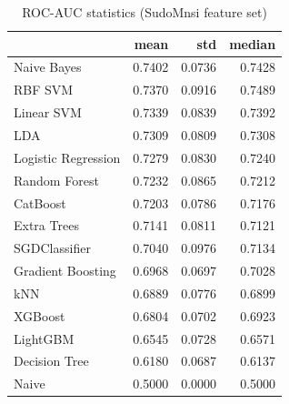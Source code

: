 \begin{table}
\caption{ROC-AUC statistics (SudoMnsi feature set)}
\label{tab:roc-auc_SudoMnsi_stats}
\begin{tabular}{lrrr}
\toprule
 & mean & std & median \\
\midrule
Naive Bayes & 0.7402 & 0.0736 & 0.7428 \\
RBF SVM & 0.7370 & 0.0916 & 0.7489 \\
Linear SVM & 0.7339 & 0.0839 & 0.7392 \\
LDA & 0.7309 & 0.0809 & 0.7308 \\
Logistic Regression & 0.7279 & 0.0830 & 0.7240 \\
Random Forest & 0.7232 & 0.0865 & 0.7212 \\
CatBoost & 0.7203 & 0.0786 & 0.7176 \\
Extra Trees & 0.7141 & 0.0811 & 0.7121 \\
SGDClassifier & 0.7040 & 0.0976 & 0.7134 \\
Gradient Boosting & 0.6968 & 0.0697 & 0.7028 \\
kNN & 0.6889 & 0.0776 & 0.6899 \\
XGBoost & 0.6804 & 0.0702 & 0.6923 \\
LightGBM & 0.6545 & 0.0728 & 0.6571 \\
Decision Tree & 0.6180 & 0.0687 & 0.6137 \\
Naive & 0.5000 & 0.0000 & 0.5000 \\
\bottomrule
\end{tabular}
\end{table}
